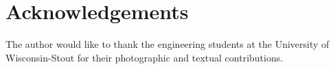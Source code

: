 \documentclass[12pt]{article}
\begin{document}
\section*{Acknowledgements}
The author would like to thank the engineering students at the University of Wisconsin-Stout for their photographic and textual contributions.


\vspace{4\baselineskip}\vspace{-\parskip} %
\footnotesize %


\end{document}
